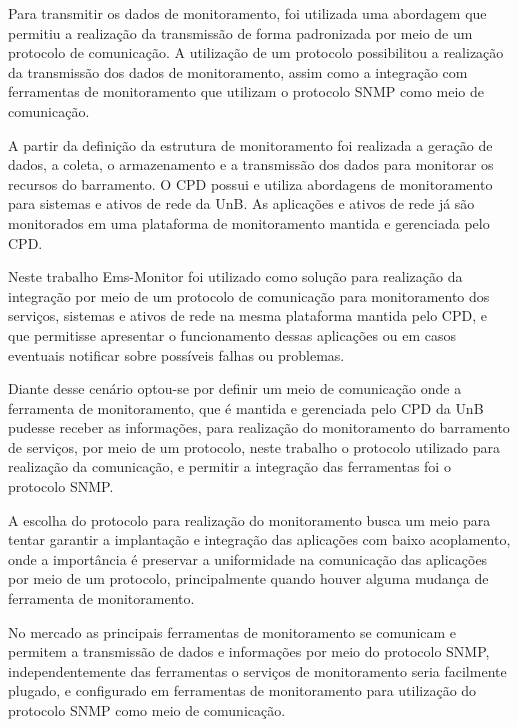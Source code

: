 Para transmitir os dados de monitoramento, foi utilizada uma abordagem que permitiu a realização da transmissão de forma padronizada por meio de um protocolo de comunicação. A utilização de um protocolo possibilitou a realização da transmissão dos dados de monitoramento, assim como a integração com ferramentas de monitoramento que utilizam o protocolo \acrshort{SNMP} como meio de comunicação.  

\vspace{10mm}
\noindent
A partir da definição da estrutura de monitoramento foi realizada a geração de dados, a coleta, o armazenamento e a transmissão dos dados para monitorar os recursos do barramento. O \acrshort{CPD} possui e utiliza abordagens de monitoramento para sistemas e ativos de rede da \acrshort{UnB}. As aplicações e ativos de rede já são monitorados em uma plataforma de monitoramento mantida e gerenciada pelo \acrshort{CPD}. 

Neste trabalho Ems-Monitor foi utilizado como solução para realização da integração por meio de um protocolo de comunicação para monitoramento dos serviços, sistemas e ativos de rede na mesma plataforma mantida pelo \acrshort{CPD}, e que permitisse apresentar o funcionamento dessas aplicações ou em casos eventuais notificar sobre possíveis falhas ou problemas. 

Diante desse cenário optou-se por definir um meio de comunicação onde a ferramenta de monitoramento, que é mantida e gerenciada pelo \acrshort{CPD} da \acrshort{UnB} pudesse receber as informações, para realização do monitoramento do barramento de serviços, por meio de um protocolo, neste trabalho o protocolo utilizado para realização da comunicação, e permitir a integração das ferramentas foi o protocolo \acrshort{SNMP}. 

A escolha do protocolo para realização do monitoramento busca um meio para tentar garantir a implantação e integração das aplicações com baixo acoplamento, onde a importância é preservar a uniformidade na comunicação das aplicações por meio de um protocolo, principalmente quando houver alguma mudança de ferramenta de monitoramento. 

No mercado as principais ferramentas de monitoramento se comunicam e permitem a transmissão de dados e informações por meio do protocolo \acrshort{SNMP}, independentemente das ferramentas o serviços de monitoramento seria facilmente plugado, e configurado em ferramentas de monitoramento para utilização do protocolo \acrshort{SNMP} como meio de comunicação.      

